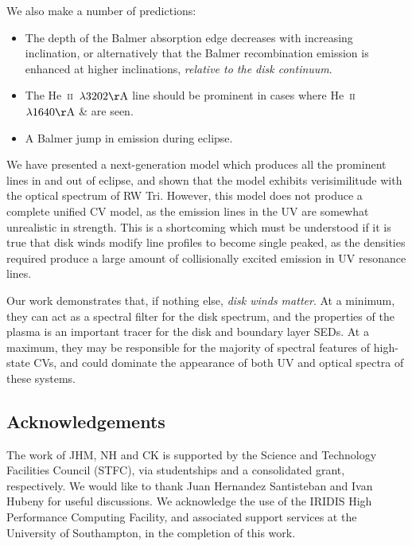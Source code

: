 \documentclass[preprint, a4paper, 11pt]{aastex}
\begin{document}
\noindent We also make a number of predictions:

\begin{itemize}
	\item The depth of the Balmer absorption edge decreases with increasing inclination,
or alternatively that the Balmer recombination emission
is enhanced at higher inclinations, {\sl relative to the disk continuum}.
	\item The He~\textsc{ii}~$\lambda3202{\rm \AA}$ line should be
prominent in cases where He~\textsc{ii}~$\lambda1640{\rm \AA}$ \& 
\heiiopt are seen. 
	\item A Balmer jump in emission during eclipse.
\end{itemize}

\smallskip
We have presented a next-generation model
which produces all the prominent lines in and out of eclipse, and
shown that the model exhibits verisimilitude with the optical spectrum of RW Tri.
However, this model does not produce a complete unified CV model, as
the emission lines in the UV are somewhat unrealistic in strength.
This is a shortcoming which must be understood if it is true that
disk winds modify line profiles to become single peaked, as the 
densities required produce a large amount of collisionally excited emission
in UV resonance lines.

Our work demonstrates that, if nothing else,
{\sl disk winds matter}. At a minimum,
they can act as a spectral filter
for the disk spectrum, and the properties of the plasma
is an important tracer for the disk and boundary layer SEDs. 
At a maximum, they may be responsible
for the majority of spectral features of high-state CVs,
and could dominate the appearance of both UV and optical
spectra of these systems.







\subsection*{Acknowledgements}
The work of JHM, NH and CK is supported by the Science and Technology Facilities Council (STFC), 
via studentships and a consolidated grant, respectively. We would like to thank Juan Hernandez Santisteban and Ivan Hubeny 
for useful discussions. We acknowledge the use of the IRIDIS High Performance Computing Facility, 
and associated support services at the University of Southampton, in the completion of this work.


\newpage
\newpage

\end{document}
